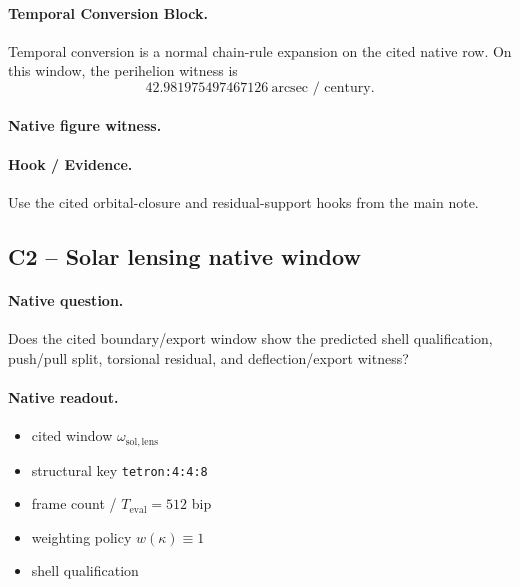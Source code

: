 \paragraph{Temporal Conversion Block.} Temporal conversion is a normal chain-rule expansion on the cited native row. On this window, the perihelion witness is
\[
42.981975497467126\ \text{arcsec / century}.
\]
\paragraph{Native figure witness.}
\begin{center}
\end{center}
\paragraph{Hook / Evidence.} Use the cited orbital-closure and residual-support hooks from the main note.


\subsection{C2 -- Solar lensing native window}\label{app:c2}
\paragraph{Native question.} Does the cited boundary/export window show the predicted shell qualification, push/pull split, torsional residual, and deflection/export witness?
\paragraph{Native readout.}
\begin{itemize}
\item cited window $\omega_{\mathrm{sol,lens}}$
\item structural key \texttt{tetron:4:4:8}
\item frame count / $T_{\mathrm{eval}}=512$ bip
\item weighting policy $w(\kappa)\equiv 1$
\item shell qualification
\end{itemize}
